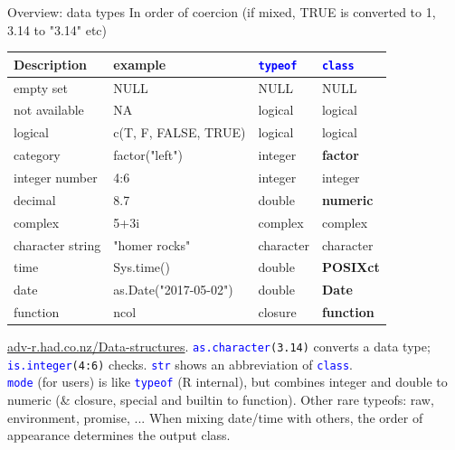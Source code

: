 \documentclass[xcolor=table,           xcolor=dvipsnames]{beamer}\usepackage[]{graphicx}\usepackage[]{color}
\newcommand{\rcode}[1]{\texttt{\textcolor{Blue}{#1}}} %
\begin{document}
\begin{frame}{Overview: data types}
\scriptsize In order of coercion (if mixed, TRUE is converted to 1,~  3.14 to "3.14" etc)
\small

\begin{center}
\begin{tabu}{| l | l | l | l |}   \hline
Description      & example         & \rcode{typeof} & \rcode{class}      \\ \hline  \hline
empty set        & NULL                 & NULL      & NULL               \\ \hline
not available    & NA                   & logical   & logical            \\ \hline
logical          & c(T, F, FALSE, TRUE) & logical   & logical            \\ \hline
category         & factor("left")       & integer   & \textbf{factor}    \\ \hline
integer number   & 4:6                  & integer   & integer            \\ \hline
decimal          & 8.7                  & double    & \textbf{numeric}   \\ \hline
complex          & 5+3i                 & complex   & complex            \\ \hline
character string & "homer rocks"        & character & character          \\ \hline
time             & Sys.time()           & double    & \textbf{POSIXct}   \\ \hline
date             & as.Date("2017-05-02")& double    & \textbf{Date}      \\ \hline
function         & ncol                 & closure   & \textbf{function}  \\ \hline
\end{tabu}
\end{center}
\scriptsize
\pause 
\href{http://adv-r.had.co.nz/Data-structures.html}{adv-r.had.co.nz/Data-structures}. 
\pause
\rcode{as.character}\texttt{(3.14)} converts a data type;  \pause \rcode{is.integer}\texttt{(4:6)} checks. \pause
\rcode{str} shows an abbreviation of \rcode{class}.\\ \pause
\rcode{mode} (for users) is like \rcode{typeof} (R internal), but combines integer and double to numeric (\& closure, special and builtin to function). \pause Other rare typeofs: raw, environment, promise, ... \pause When mixing date/time with others, the order of appearance determines the output class.
\label{datatypes}
\end{frame}
\end{document}

